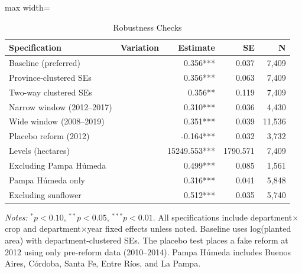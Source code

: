 \begin{table}[H]
\centering
\caption{Robustness Checks}
\label{tab:robustness}
\begin{threeparttable}
\begin{adjustbox}{max width=\textwidth}
\begin{tabular}{llrrr}
\toprule
Specification & Variation & Estimate & SE & N \\
\midrule
Baseline (preferred) & & 0.356*** & 0.037 & 7,409 \\
Province-clustered SEs & & 0.356*** & 0.063 & 7,409 \\
Two-way clustered SEs & & 0.356** & 0.119 & 7,409 \\
Narrow window (2012--2017) & & 0.310*** & 0.036 & 4,430 \\
Wide window (2008--2019) & & 0.351*** & 0.039 & 11,536 \\
Placebo reform (2012) & & -0.164*** & 0.032 & 3,732 \\
Levels (hectares) & & 15249.553*** & 1790.571 & 7,409 \\
Excluding Pampa H\'{u}meda & & 0.499*** & 0.085 & 1,561 \\
Pampa H\'{u}meda only & & 0.316*** & 0.041 & 5,848 \\
Excluding sunflower & & 0.512*** & 0.035 & 5,740 \\
\bottomrule
\end{tabular}
\end{adjustbox}
\begin{tablenotes}[flushleft]
\small
\item \textit{Notes:} $^{*}p<0.10$, $^{**}p<0.05$, $^{***}p<0.01$. All specifications include department$\times$crop and department$\times$year fixed effects unless noted. Baseline uses log(planted area) with department-clustered SEs. The placebo test places a fake reform at 2012 using only pre-reform data (2010--2014). Pampa H\'{u}meda includes Buenos Aires, C\'{o}rdoba, Santa Fe, Entre R\'{i}os, and La Pampa.
\end{tablenotes}
\end{threeparttable}
\end{table}

